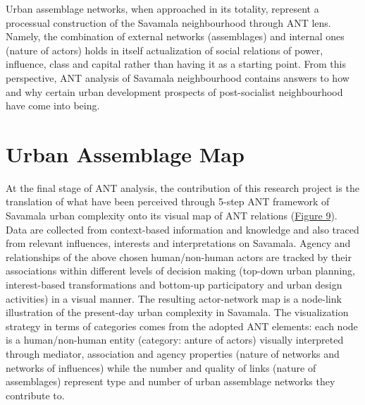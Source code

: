 \documentclass[11pt]{report}
\begin{document}
Urban assemblage networks, when approached in its totality, represent a processual construction of the Savamala neighbourhood through ANT lens.
Namely, the combination of external networks (assemblages) and internal ones (nature of actors) holds in itself actualization of social relations of power, influence, class and capital rather than having it as a starting point.
From this perspective, ANT analysis of Savamala neighbourhood contains answers to how and why certain urban development prospects of post-socialist neighbourhood have come into being.


\section{Urban Assemblage Map}

At the final stage of ANT analysis, the contribution of this research project is the translation of what have been perceived through 5-step ANT framework of Savamala urban complexity onto its visual map of ANT relations (\href{ref}{Figure 9}). 
\\

Data are collected from context-based information and knowledge and also traced from relevant influences, interests and interpretations on Savamala.
Agency and relationships of the above chosen human/non-human actors are tracked by their associations within different levels of decision making (top-down urban planning, interest-based transformations and bottom-up participatory and urban design activities) in a visual manner.
The resulting actor-network map is a node-link illustration of the present-day urban complexity in Savamala.
The visualization strategy in terms of categories comes from the adopted ANT elements: each node is a human/non-human entity (category: anture of actors) visually interpreted through mediator, association and agency properties (nature of networks and networks of influences) while the number and quality of links (nature of assemblages) represent type and number of urban assemblage networks they contribute to.
\\
\end{document}
